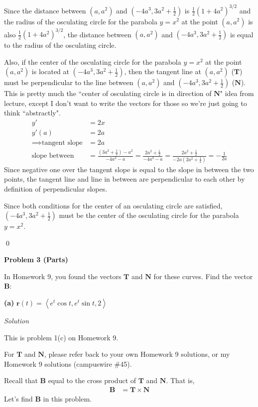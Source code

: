\documentclass{article}
\newcommand{\lrp}[1]{\left( #1 \right)}
\newcommand{\lra}[1]{\left\langle #1 \right\rangle}
\newcommand{\T}[0]{\mathbf{T}}
\newcommand{\N}[0]{\mathbf{N}}
\newcommand{\B}[0]{\mathbf{B}}
\renewcommand{\r}[0]{\mathbf{r}}
\newcommand{\Solution}{\textit{Solution}}
\begin{document}
Since the distance between $(a,a^2)$ and $\displaystyle\lrp{-4a^3,3a^2+\frac{1}{2}}$ is $\displaystyle \frac{1}{2}(1+4a^2)^{3/2}$ and the radius of the osculating circle for the parabola $y=x^2$ at the point $(a,a^2)$ is also $\displaystyle \frac{1}{2}(1+4a^2)^{3/2}$, the distance between $(a,a^2)$ and $\displaystyle\lrp{-4a^3,3a^2+\frac{1}{2}}$ is equal to the radius of the osculating circle.

Also, if the center of the osculating circle for the parabola $y=x^2$ at the point $(a,a^2)$ is located at $\displaystyle\lrp{-4a^3,3a^2+\frac{1}{2}}$, then the tangent line at $(a,a^2)$ ($\T$) must be perpendicular to the line between $(a,a^2)$ and $\displaystyle\lrp{-4a^3,3a^2+\frac{1}{2}}$ ($\N$). This is pretty much the ``center of osculating circle is in direction of $\N$" idea from lecture, except I don't want to write the vectors for those so we're just going to think ``abstractly".
\begin{align*}
    y'&=2x\\
    y'(a)&=2a\\
    \implies \text{tangent slope}&=2a\\
    \text{slope between}&=\frac{\lrp{3a^2+\frac{1}{2}}-a^2}{-4a^3-a}=\frac{2a^2+\frac{1}{2}}{-4a^3-a}=\frac{2a^2+\frac{1}{2}}{-2a\lrp{2a^2+\frac{1}{2}}}=-\frac{1}{2a}
\end{align*}
Since negative one over the tangent slope is equal to the slope in between the two points, the tangent line and line in between are perpendicular to each other by definition of perpendicular slopes.

Since both conditions for the center of an osculating circle are satisfied, $\displaystyle\lrp{-4a^3,3a^2+\frac{1}{2}}$ must be the center of the osculating circle for the parabola $y=x^2$.

\qed
\newpage
{}
{}\textbf{Problem 3 (Parts)} 

In Homework 9, you found the vectors $\T$ and $\N$ for these curves. Find the vector $\B$:

{}\textbf{(a)} $\r(t)=\lra{e^t\cos t,e^t\sin t,2}$

\Solution

This is problem 1(c) on Homework 9.

For $\T$ and $\N$, please refer back to your own Homework 9 solutions, or my Homework 9 solutions (campuswire \#45).

Recall that $\B$ equal to the cross product of $\T$ and $\N$. That is,
\begin{align*}
    \B&=\T \times \N
\end{align*}
Let's find $\B$ in this problem.
\end{document}
